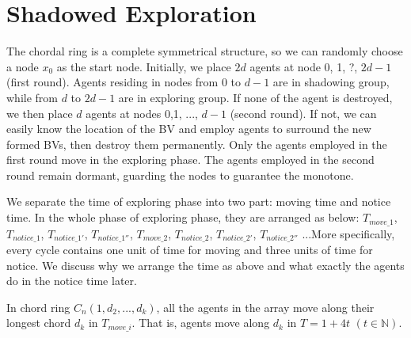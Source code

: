 \section{Shadowed Exploration}
The chordal ring is a complete symmetrical structure, so we can randomly choose a node $x_0$ as the start node. Initially, we place $2d$ agents at node 0, 1, ?, $2d-1$ (first round). Agents residing in nodes from $0$ to $d-1$ are in shadowing group, while from $d$ to $2d-1$ are in exploring group. If none of the agent is destroyed, we then place $d$ agents at nodes 0,1, ..., $d-1$ (second round). If not, we can easily know the location of the BV and employ agents to surround the new formed BVs, then destroy them permanently. Only the agents employed in the first round move in the exploring phase. The agents employed in the second round remain dormant, guarding the nodes to guarantee the monotone. 

We separate the time of exploring phase into two part: moving time and notice time. In the whole phase of exploring phase, they are arranged as below: $T_{move\_1}$, $T_{notice\_1}$, $T_{notice\_1'}$, $T_{notice\_1''}$, $T_{move\_2}$, $T_{notice\_2}$, $T_{notice\_2'}$, $T_{notice\_2''}$ ...More specifically, every cycle contains one unit of time for moving and three units of time for notice. We discuss why we arrange the time as above and what exactly the agents do in the notice time later. 

In chord ring $C_n(1, d_2, ..., d_k)$, all the agents in the array move along their longest chord $d_k$ in $T_{move\_i}$. That is, agents move along $d_k$ in $T=1+4t$ $(t\in \mathbb{N})$. 



